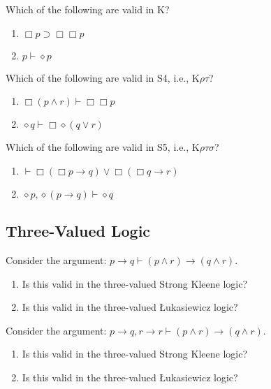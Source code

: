 \documentclass[
]{article}
\providecommand{\tightlist}{%
  \setlength{\itemsep}{0pt}\setlength{\parskip}{0pt}}\usepackage{longtable,booktabs,array}
\begin{document}
Which of the following are valid in K?

\begin{enumerate}
\def\labelenumi{\arabic{enumi}.}
\setcounter{enumi}{6}
\tightlist
\item
  \(\Box p \supset \Box \Box p\)
\item
  \(p \vdash \diamond p\)
\end{enumerate}

Which of the following are valid in S4, i.e., K\(\rho \tau\)?

\begin{enumerate}
\def\labelenumi{\arabic{enumi}.}
\setcounter{enumi}{8}
\tightlist
\item
  \(\Box (p \wedge r) \vdash \Box \Box p\)
\item
  \(\diamond q \vdash \Box \diamond (q \vee r)\)
\end{enumerate}

Which of the following are valid in S5, i.e., K\(\rho \tau \sigma\)?

\begin{enumerate}
\def\labelenumi{\arabic{enumi}.}
\setcounter{enumi}{10}
\tightlist
\item
  \(\vdash \Box(\Box p \rightarrow q) \vee \Box(\Box q \rightarrow r)\)
\item
  \(\diamond p, \diamond (p \rightarrow q) \vdash \diamond q\)
\end{enumerate}

\hypertarget{three-valued-logic}{%
\subsection{Three-Valued Logic}\label{three-valued-logic}}

Consider the argument:
\(p \rightarrow q \vdash (p \wedge r) \rightarrow (q \wedge r)\).

\begin{enumerate}
\def\labelenumi{\arabic{enumi}.}
\setcounter{enumi}{12}
\tightlist
\item
  Is this valid in the three-valued Strong Kleene logic?
\item
  Is this valid in the three-valued Łukasiewicz logic?
\end{enumerate}

Consider the argument:
\(p \rightarrow q, r \rightarrow r \vdash (p \wedge r) \rightarrow (q \wedge r)\).

\begin{enumerate}
\def\labelenumi{\arabic{enumi}.}
\setcounter{enumi}{14}
\tightlist
\item
  Is this valid in the three-valued Strong Kleene logic?
\item
  Is this valid in the three-valued Łukasiewicz logic?
\end{enumerate}
\end{document}
